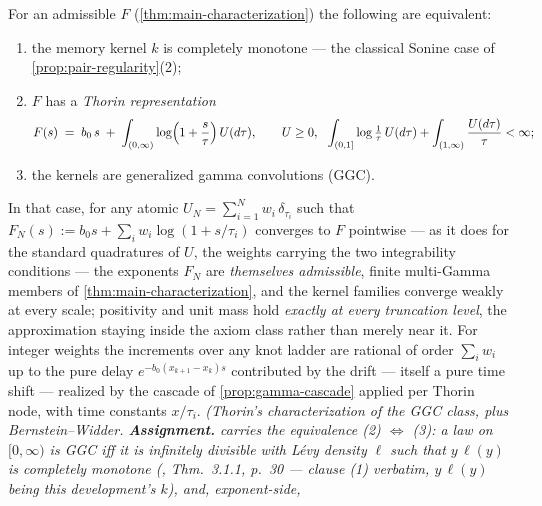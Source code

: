\begin{proposition}\label{prop:thorin-subclass}
For an admissible $F$ (\ref{thm:main-characterization}) the following are equivalent:
\begin{enumerate}
\item the memory kernel $k$ is completely monotone --- the classical Sonine case of
\ref{prop:pair-regularity}(2);
\item $F$ has a \emph{Thorin representation}
\[
  F(s) \;=\; b_0\,s \;+\; \int_{(0,\infty)} \log\Bigl(1 + \frac{s}{\tau}\Bigr)\,U(d\tau),
  \qquad U \ge 0,\ \
  \int_{(0,1]} \log\tfrac{1}{\tau}\,U(d\tau) + \int_{(1,\infty)} \frac{U(d\tau)}{\tau} < \infty;
\]
\item the kernels are generalized gamma convolutions (GGC).
\end{enumerate}
In that case, for any atomic $U_N = \sum_{i=1}^N w_i\,\delta_{\tau_i}$ such that
$F_N(s) := b_0 s + \sum_i w_i \log(1 + s/\tau_i)$ converges to $F$ pointwise --- as it does
for the standard quadratures of $U$, the weights carrying the two integrability conditions
--- the exponents $F_N$ are \emph{themselves admissible}, finite multi-Gamma members of
\ref{thm:main-characterization}, and the kernel families converge weakly at every
scale; positivity and unit mass hold \emph{exactly at every truncation level}, the
approximation staying inside the axiom class rather than merely near it. For integer weights
the increments over any knot ladder are rational of order $\sum_i w_i$ up to the pure delay
$e^{-b_0(x_{k+1}-x_k)s}$ contributed by the drift --- itself a pure time shift --- realized
by the cascade of \ref{prop:gamma-cascade} applied per
Thorin node, with time constants $x/\tau_i$.
\statusA\quad{}\quad{}\quad\emph{(Thorin's characterization of the GGC
class, plus Bernstein--Widder.
\textbf{Assignment.}  carries the equivalence (2) $\Leftrightarrow$ (3): a law
on $[0,\infty)$ is GGC iff it is infinitely divisible with L\'evy density $\ell$ such that
$y\,\ell(y)$ is completely monotone (\sscite{bondesson1992generalized}, Thm.~3.1.1, p.~30
--- clause (1) verbatim, $y\,\ell(y)$ being this development's $k$), and, exponent-side,
}
\end{proposition}
